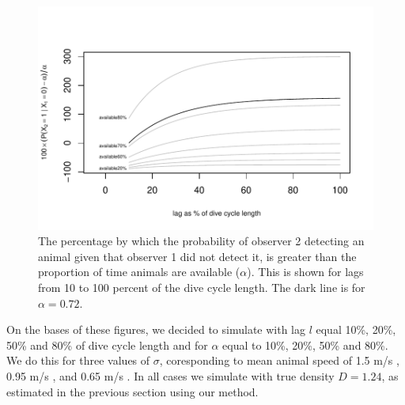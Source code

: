 \documentclass[useAMS, usenatbib, referee]{biom}\usepackage[]{graphicx}\usepackage[]{color}
\makeatletter
\def\maxwidth{ %
  \ifdim\Gin@nat@width>\linewidth
    \linewidth
  \else
    \Gin@nat@width
  \fi
}
\newenvironment{knitrout}{}{} %
\makeatother
\begin{document}
\begin{knitrout}
\color{fgcolor}\begin{figure}

{\centering \includegraphics[width=\maxwidth]{figs/fig_p_unavail_plot-1} 

}

\caption[The percentage by which the probability of observer 2 detecting an animal given that observer 1 did not detect it, is greater than the proportion of time animals are available (\(\alpha\))]{The percentage by which the probability of observer 2 detecting an animal given that observer 1 did not detect it, is greater than the proportion of time animals are available (\(\alpha\)). This is shown for lags from 10 to 100 percent of the dive cycle length. The dark line is for \(\alpha=0.72\).}\label{fig:fig_p_unavail_plot}
\end{figure}


\end{knitrout}

On the bases of these figures, we decided to simulate with lag $l$ equal 10\%, 20\%, 50\% and 80\% of dive cycle length and for $\alpha$ equal to 10\%, 20\%, 50\% and 80\%. We do this for three values of $\sigma$, coresponding to mean animal speed of 1.5 m/s \citep[the value estimated by][]{Hiby+Lovell:98}, 0.95 m/s \citep[the value estimated by][]{Westgate+al:95}, and 0.65 m/s \citep[the value estimated by][,which being lower than that which we estimated above, broadens the range of our simulations beyond that were we to use our estimate of $\sigma$]{Stevenson+al:18}. In all cases we simulate with true density $D=1.24$, as estimated in the previous section using our method.
\end{document}
